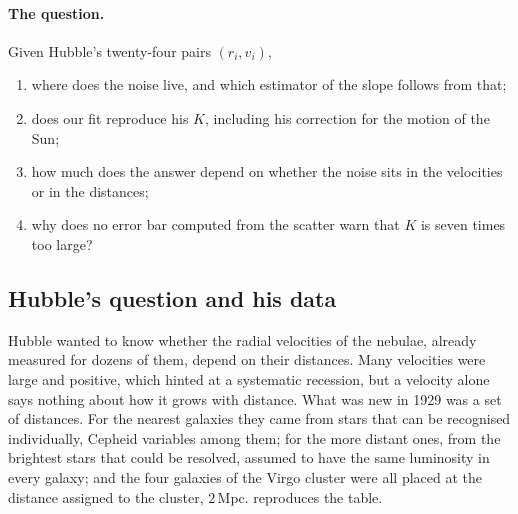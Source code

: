 \paragraph{The question.} Given Hubble's twenty-four pairs $(r_i,v_i)$,
\begin{enumerate}
  \item where does the noise live, and which estimator of the slope follows from that;
  \item does our fit reproduce his $K$, including his correction for the motion of
        the Sun;
  \item how much does the answer depend on whether the noise sits in the velocities
        or in the distances;
  \item why does no error bar computed from the scatter warn that $K$ is seven
        times too large?
\end{enumerate}

\subsection{Hubble's question and his data}
\label{11c:sec:hubble-data}

Hubble wanted to know whether the radial velocities of the nebulae, already
measured for dozens of them, depend on their distances. Many velocities were
large and positive, which hinted at a systematic recession, but a velocity alone
says nothing about how it grows with distance. What was new in 1929 was a set of
distances. For the nearest galaxies they came from stars that can be recognised
individually, Cepheid variables among them; for the more distant ones, from the
brightest stars that could be resolved, assumed to have the same luminosity in
every galaxy; and the four galaxies of the Virgo cluster were all placed at the
distance assigned to the cluster, $2$\,Mpc.  reproduces
the table.

